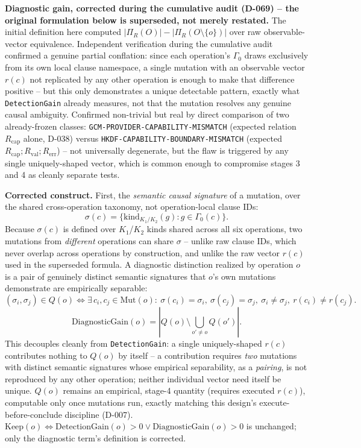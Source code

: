 \documentclass[11pt,a4paper]{article}
\begin{document}
\textbf{Diagnostic gain, corrected during the cumulative audit (D-069) -- the original formulation below is superseded, not merely restated.} The initial definition here computed $|\Pi_R(O)| - |\Pi_R(O\setminus\{o\})|$ over raw observable-vector equivalence. Independent verification during the cumulative audit confirmed a genuine partial conflation: since each operation's $\Gamma_0$ draws exclusively from its own local clause namespace, a single mutation with an observable vector $r(c)$ not replicated by any other operation is enough to make that difference positive -- but this only demonstrates a unique detectable pattern, exactly what \texttt{DetectionGain} already measures, not that the mutation resolves any genuine causal ambiguity. Confirmed non-trivial but real by direct comparison of two already-frozen classes: \texttt{GCM-PROVIDER-CAPABILITY-MISMATCH} (expected relation $R_{\text{cap}}$ alone, D-038) versus \texttt{HKDF-CAPABILITY-BOUNDARY-MISMATCH} (expected $R_{\text{cap}};R_{\text{val}};R_{\text{err}}$) -- not universally degenerate, but the flaw is triggered by any single uniquely-shaped vector, which is common enough to compromise stages 3 and 4 as cleanly separate tests.

\textbf{Corrected construct.} First, the \emph{semantic causal signature} of a mutation, over the shared cross-operation taxonomy, not operation-local clause IDs:
\[
\sigma(c) = \{\text{kind}_{K_1/K_2}(g) : g\in\Gamma_0(c)\}.
\]
Because $\sigma(c)$ is defined over $K_1$/$K_2$ kinds shared across all six operations, two mutations from \emph{different} operations can share $\sigma$ -- unlike raw clause IDs, which never overlap across operations by construction, and unlike the raw vector $r(c)$ used in the superseded formula. A diagnostic distinction realized by operation $o$ is a pair of genuinely distinct semantic signatures that $o$'s own mutations demonstrate are empirically separable:
\[
(\sigma_i,\sigma_j)\in Q(o) \iff \exists\, c_i,c_j\in\text{Mut}(o):\ \sigma(c_i)=\sigma_i,\ \sigma(c_j)=\sigma_j,\ \sigma_i\neq\sigma_j,\ r(c_i)\neq r(c_j).
\]
\[
\text{DiagnosticGain}(o) = \left|Q(o)\setminus\bigcup_{o'\neq o}Q(o')\right|.
\]
This decouples cleanly from \texttt{DetectionGain}: a single uniquely-shaped $r(c)$ contributes nothing to $Q(o)$ by itself -- a contribution requires \emph{two} mutations with distinct semantic signatures whose empirical separability, as a \emph{pairing}, is not reproduced by any other operation; neither individual vector need itself be unique. $Q(o)$ remains an empirical, stage-4 quantity (requires executed $r(c)$), computable only once mutations run, exactly matching this design's execute-before-conclude discipline (D-007). $\text{Keep}(o)\iff\text{DetectionGain}(o)>0\vee\text{DiagnosticGain}(o)>0$ is unchanged; only the diagnostic term's definition is corrected.
\end{document}
